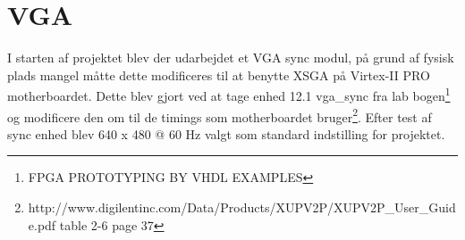 \section{VGA}
I starten af projektet blev der udarbejdet et VGA sync modul, på grund af fysisk plads mangel måtte dette modificeres til at benytte XSGA på Virtex-II PRO motherboardet. Dette blev gjort ved at tage enhed 12.1 vga\_sync fra lab bogen\footnote{FPGA PROTOTYPING BY VHDL EXAMPLES} og modificere den om til de timings som motherboardet bruger\footnote{http://www.digilentinc.com/Data/Products/XUPV2P/XUPV2P\_User\_Guide.pdf table 2-6 page 37}.
Efter test af sync enhed blev 640 x 480 @ 60 Hz valgt som standard indstilling for projektet.
